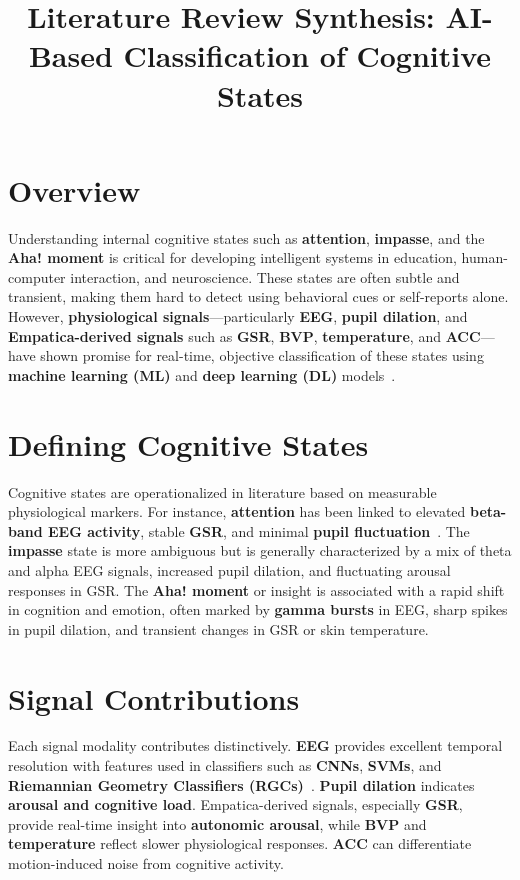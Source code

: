 \documentclass[12pt]{article}
\title{Literature Review Synthesis: AI-Based Classification of Cognitive States}
\author{}
\date{}
\begin{document}
\maketitle

\section*{Overview}
Understanding internal cognitive states such as \textbf{attention}, \textbf{impasse}, and the \textbf{Aha! moment} is critical for developing intelligent systems in education, human-computer interaction, and neuroscience. These states are often subtle and transient, making them hard to detect using behavioral cues or self-reports alone. However, \textbf{physiological signals}---particularly \textbf{EEG}, \textbf{pupil dilation}, and \textbf{Empatica-derived signals} such as \textbf{GSR}, \textbf{BVP}, \textbf{temperature}, and \textbf{ACC}---have shown promise for real-time, objective classification of these states using \textbf{machine learning (ML)} and \textbf{deep learning (DL)} models~\cite{appriou2020modern}.

\section*{Defining Cognitive States}
Cognitive states are operationalized in literature based on measurable physiological markers. For instance, \textbf{attention} has been linked to elevated \textbf{beta-band EEG activity}, stable \textbf{GSR}, and minimal \textbf{pupil fluctuation}~\cite{sosa2011classification}. The \textbf{impasse} state is more ambiguous but is generally characterized by a mix of theta and alpha EEG signals, increased pupil dilation, and fluctuating arousal responses in GSR. The \textbf{Aha! moment} or insight is associated with a rapid shift in cognition and emotion, often marked by \textbf{gamma bursts} in EEG, sharp spikes in pupil dilation, and transient changes in GSR or skin temperature.

\section*{Signal Contributions}
Each signal modality contributes distinctively. \textbf{EEG} provides excellent temporal resolution with features used in classifiers such as \textbf{CNNs}, \textbf{SVMs}, and \textbf{Riemannian Geometry Classifiers (RGCs)}~\cite{appriou2020modern}. \textbf{Pupil dilation} indicates \textbf{arousal and cognitive load}. Empatica-derived signals, especially \textbf{GSR}, provide real-time insight into \textbf{autonomic arousal}, while \textbf{BVP} and \textbf{temperature} reflect slower physiological responses. \textbf{ACC} can differentiate motion-induced noise from cognitive activity.
\end{document}
